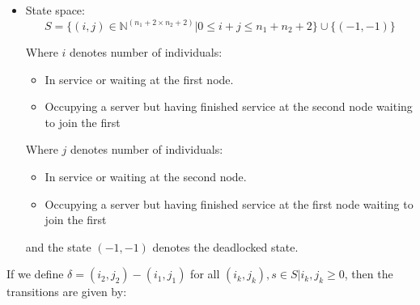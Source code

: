 \documentclass{article}
\begin{document}
\begin{itemize}
    \item State space:
        \[S = \{(i,j)\in\mathbb{N}^{(n_1+2\times n_2+2)}| 0 \leq i + j \leq n_1 + n_2 + 2
        \}\cup\{(-1, -1)\}\]

        Where \(i\) denotes number of individuals:
            \begin{itemize}
                \item In service or waiting at the first node.
                \item Occupying a server but having finished service at the
                    second node waiting to join the first
            \end{itemize}
        Where \(j\) denotes number of individuals:
            \begin{itemize}
                \item In service or waiting at the second node.
                \item Occupying a server but having finished service at the
                    first node waiting to join the first
            \end{itemize}
        and the state $(-1, -1)$ denotes the deadlocked state.
\end{itemize}

If we define $\delta = (i_2, j_2) - (i_1, j_1)$ for all $(i_k, j_k), s \in S | i_k, j_k \geq 0$, then the transitions are given by:
\end{document}
